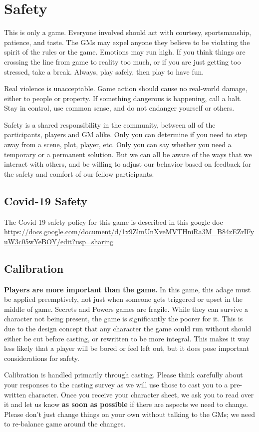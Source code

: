 \documentclass[sheet]{GL2020}
\begin{document}
\section{Safety}
This is only a game.  Everyone involved should act with courtesy, sportsmanship, patience, and taste.  The GMs may expel anyone they believe to be violating the spirit of the rules or the game.  Emotions may run high. If you think things are crossing the line from game to reality too much, or if you are just getting too stressed, take a break. Always, play safely, then play to have fun. 

Real violence is unacceptable. Game action should cause no real-world damage, either to people or property. If something dangerous is happening, call a halt. Stay in control, use common sense, and do not endanger yourself or others.

Safety is a shared responsibility in the community, between all of the participants, players and GM alike. Only you can determine if you need to step away from a scene, plot, player, etc. Only you can say whether you need a temporary or a permanent solution. But we can all be aware of the ways that we interact with others, and be willing to adjust our behavior based on feedback for the safety and comfort of our fellow participants.

\subsection{Covid-19 Safety}
The Covid-19 safety policy for this game is described in this google doc \url{https://docs.google.com/document/d/1x9ZlmUnXveMVTHniRa3M_B84zEZrIFyuW3c05wYeBOY/edit?usp=sharing}

\subsection{Calibration}
\textbf{Players are more important than the game.} In this game, this adage must be applied preemptively, not just when someone gets triggered or upset in the middle of game. Secrets and Powers games are fragile. While they can survive a character not being present, the game is significantly the poorer for it. This is due to the design concept that any character the game could run without should either be cut before casting, or rewritten to be more integral. This makes it way less likely that a player will be bored or feel left out, but it does pose important considerations for safety.

Calibration is handled primarily through casting. Please think carefully about your responses to the casting survey as we will use those to cast you to a pre-written character. Once you receive your character sheet, we ask you to read over it and let us know \textbf{as soon as possible} if there are aspects we need to change. Please don't just change things on your own without talking to the GMs; we need to re-balance game around the changes.
\end{document}
